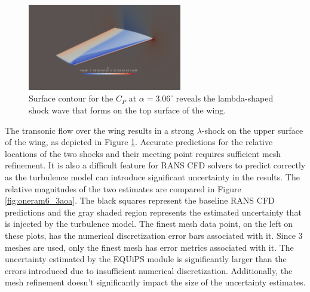 \begin{figure}
\center
\includegraphics[width=0.6\textwidth]{code/image_gen/oneram6/images/oneram6_cp_contour.png}
\caption{Surface contour for the $C_P$ at $\alpha= 3.06^\circ$ reveals the lambda-shaped shock wave that forms on the top surface of the wing. \label{fig:oneram6_cp}}
\end{figure}

The transonic flow over the wing results in a strong $\lambda$-shock on the upper surface of the wing, as depicted in Figure \ref{fig:oneram6_cp}.
Accurate predictions for the relative locations of the two shocks and their meeting point requires sufficient mesh refinement. 
It is also a difficult feature for RANS CFD solvers to predict correctly as the turbulence model can introduce significant uncertainty in the results.
The relative magnitudes of the two estimates are compared in Figure \ref{fig:oneram6_3aoa}.
The black squares represent the baseline RANS CFD predictions and the gray shaded region represents the estimated uncertainty that is injected by the turbulence model. 
The finest mesh data point, on the left on these plots, has the numerical discretization error bars associated with it. 
Since 3 meshes are used, only the finest mesh has error metrics associated with it. 
The uncertainty estimated by the EQUiPS module is significantly larger than the errors introduced due to insufficient numerical discretization.
Additionally, the mesh refinement doesn't significantly impact the size of the uncertainty estimates. 

